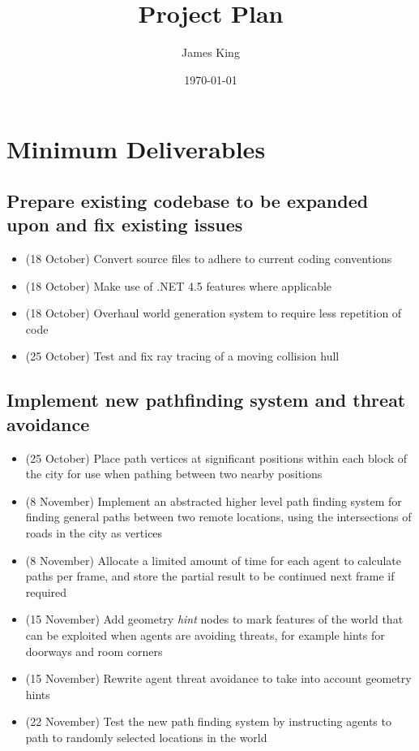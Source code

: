 \documentclass[a4paper,11pt]{article}
\title{\centering Project Plan}
\date{\today}
\author{James King}
\begin{document}
\section{Minimum Deliverables}
\subsection{Prepare existing codebase to be expanded upon and fix existing
    issues}
    \begin{itemize}
    \item (18 October) Convert source files to adhere to current coding
        conventions
    \item (18 October) Make use of .NET 4.5 features where applicable
    \item (18 October) Overhaul world generation system to require less
        repetition of code        
    \item (25 October) Test and fix ray tracing of a moving collision hull
    \end{itemize}
\subsection{Implement new pathfinding system and threat avoidance}
    \begin{itemize}
    \item (25 October) Place path vertices at significant positions within each
        block of the city for use when pathing between two nearby positions
    \item (8 November) Implement an abstracted higher level path finding system 
        for finding general paths between two remote locations, using the
        intersections of roads in the city as vertices
    \item (8 November) Allocate a limited amount of time for each agent to
        calculate paths per frame, and store the partial result to be continued
        next frame if required 
    \item (15 November) Add geometry \emph{hint} nodes to mark features of the
        world that can be exploited when agents are avoiding threats, for
        example hints for doorways and room corners
    \item (15 November) Rewrite agent threat avoidance to take into account
        geometry hints        
    \item (22 November) Test the new path finding system by instructing agents
        to path to randomly selected locations in the world
    \end{itemize}
\end{document}
